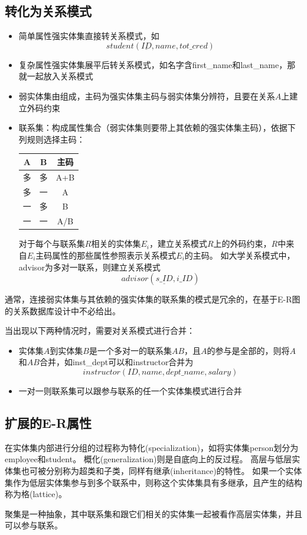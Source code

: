 \subsection{转化为关系模式}
\begin{itemize}
	\item 简单属性强实体集直接转关系模式，如
	\[student(\underline{ID},name,tot\_cred)\]
	\item 复杂属性强实体集展平后转关系模式，如名字含first\_name和last\_name，那就一起放入关系模式
	\item 弱实体集由组成，主码为强实体集主码与弱实体集分辨符，且要在关系$A$上建立外码约束
	\item 联系集：构成属性集合（弱实体集则要带上其依赖的强实体集主码），依据下列规则选择主码：
	\begin{center}
	\begin{tabular}{|c|c|c|}\hline
		A & B & 主码\\\hline
		多 & 多 & A+B\\\hline
		多 & 一 & A\\\hline
		一 & 多 & B\\\hline
		一 & 一 & A/B\\\hline
	\end{tabular}
	\end{center}
	对于每个与联系集$R$相关的实体集$E_i$，建立关系模式$R$上的外码约束，$R$中来自$E_i$主码属性的那些属性参照表示关系模式$E_i$的主码。
	如大学关系模式中，advisor为多对一联系，则建立关系模式
	\[advisor(\underline{s\_ID},i\_ID)\]
\end{itemize}

通常，连接弱实体集与其依赖的强实体集的联系集的模式是冗余的，在基于E-R图的关系数据库设计中不必给出。

当出现以下两种情况时，需要对关系模式进行合并：
\begin{itemize}
	\item 实体集$A$到实体集$B$是一个多对一的联系集$AB$，且$A$的参与是全部的，则将$A$和$AB$合并，如inst\_dept可以和instructor合并为
	\[instructor(ID,name,dept\_name,salary)\]
	\item 一对一则联系集可以跟参与联系的任一个实体集模式进行合并
\end{itemize}

\subsection{扩展的E-R属性}
\begin{definition}[特化和泛化]
在实体集内部进行分组的过程称为特化(specialization)，如将实体集person划分为employee和student。
概化(generalization)则是自底向上的反过程。
高层与低层实体集也可被分别称为超类和子类，同样有继承(inheritance)的特性。
如果一个实体集作为低层实体集参与到多个联系中，则称这个实体集具有多继承，且产生的结构称为格(lattice)。
\end{definition}

\begin{definition}[聚集]
聚集是一种抽象，其中联系集和跟它们相关的实体集一起被看作高层实体集，并且可以参与联系。
\end{definition}